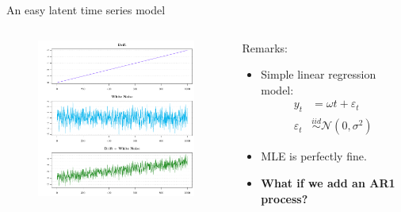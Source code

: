 \documentclass[envcountsect,usenames,dvipsnames]{beamer}
\theoremstyle{mystyle}
\begin{document}
\begin{frame}{An easy latent time series model}
	 	\begin{columns}
		\begin{column}{0.6\textwidth}
			\vspace{0.3cm}
			\begin{figure}
				\vspace{-0.8cm}
			    \centering
			  \includegraphics[width = 7cm]{Images/DR_WN_Pub}
			\end{figure}
		
		\end{column}
		\begin{column}{0.35\textwidth}
		\begin{block}{Remarks:}
			\begin{itemize}
			\item Simple linear regression model:
			\begin{equation*}
				\begin{aligned}
						y_t &= \omega t + \varepsilon_t\\
						 \varepsilon_t &\stackrel{iid}{\sim} \mathcal{N}\left(0, \sigma^2\right)
				\end{aligned}
			\end{equation*}
			
			\item MLE is perfectly fine.
			
			\item \textbf{{\color{beamer@UIUCblue}What if we add an AR1 process?}}
			\end{itemize}
		\end{block}
		\end{column}
		\end{columns}
\end{frame}
\end{document}
